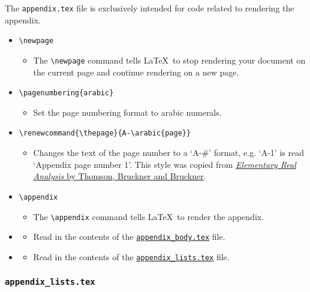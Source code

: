 
The \texttt{appendix.tex} file is exclusively intended for code related to rendering the appendix.
\begin{itemize}
    \item \lstinline|\newpage|
    \begin{itemize}
        \item The \lstinline|\newpage| command tells \LaTeX\ to stop rendering your document on the current page and continue rendering on a new page.
    \end{itemize}
    \item \lstinline|\pagenumbering{arabic}|
    \begin{itemize}
        \item Set the page numbering format to arabic numerals.
    \end{itemize}
    \item \lstinline|\renewcommand{\thepage}{A-\arabic{page}}|
    \begin{itemize}
        \item Changes the text of the page number to a `A-\#' format, e.g. `A-1' is read `Appendix page number 1'. This style was copied from \href{https://www.isbns.fm/isbn/9781434843678/}{\textit{Elementary Real Analysis} by Thomson, Bruckner and Bruckner}.
    \end{itemize}
    \item \lstinline|\appendix|
    \begin{itemize}
        \item The \lstinline|\appendix| command tells \LaTeX\ to render the appendix.
    \end{itemize}
    \item \lstinline||
    \begin{itemize}
        \item Read in the contents of the \hyperref[sec:appendix_body.tex]{\texttt{appendix\_body.tex}} file.
    \end{itemize}
    \item \lstinline||
    \begin{itemize}
        \item Read in the contents of the \hyperref[sec:appendix_lists.tex]{\texttt{appendix\_lists.tex}} file.
    \end{itemize}
\end{itemize}

\subsubsection{\texttt{appendix\_lists.tex}}
\label{sec:appendix_lists.tex}

